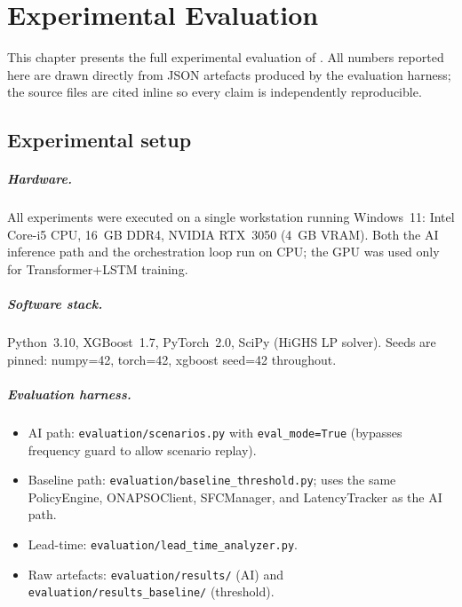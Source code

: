 \chapter{Experimental Evaluation}
\label{ch:eval}

This chapter presents the full experimental evaluation of \padonap{}.
All numbers reported here are drawn directly from JSON artefacts produced
by the evaluation harness; the source files are cited inline so every
claim is independently reproducible.

\section{Experimental setup}
\label{sec:setup}

\paragraph{Hardware.}
All experiments were executed on a single workstation running Windows~11:
Intel Core-i5 CPU, 16~GB DDR4, NVIDIA RTX~3050 (4~GB VRAM). Both the
AI inference path and the orchestration loop run on CPU; the GPU was used
only for Transformer+LSTM training.

\paragraph{Software stack.}
Python~3.10, XGBoost~1.7, PyTorch~2.0, SciPy (HiGHS LP solver).
Seeds are pinned: numpy=42, torch=42, xgboost seed=42 throughout.

\paragraph{Evaluation harness.}
\begin{itemize}
  \item AI path: \texttt{evaluation/scenarios.py} with \texttt{eval\_mode=True}
        (bypasses frequency guard to allow scenario replay).
  \item Baseline path: \texttt{evaluation/baseline\_threshold.py}; uses the
        same PolicyEngine, ONAPSOClient, SFCManager, and LatencyTracker as
        the AI path.
  \item Lead-time: \texttt{evaluation/lead\_time\_analyzer.py}.
  \item Raw artefacts: \texttt{evaluation/results/} (AI) and
        \texttt{evaluation/results\_baseline/} (threshold).
\end{itemize}

